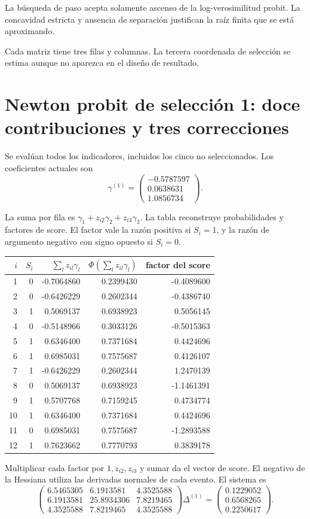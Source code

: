 \documentclass[11pt,a4paper]{article}
\begin{document}
La búsqueda de paso
acepta solamente ascenso
de la log-verosimilitud probit.
La concavidad estricta y
ausencia de separación
justifican la raíz finita
que se está aproximando.

Cada matriz tiene tres
filas y columnas.
La tercera coordenada
de selección se estima
aunque no aparezca
en el diseño de resultado.

\clearpage
\section{Newton probit de selección 1: doce contribuciones y tres correcciones}\label{unidad156}
Se evalúan todos los indicadores,
incluidos los cinco no seleccionados.
Los coeficientes actuales son
\[
\gamma^{(1)}=\begin{pmatrix}-0.5787597\\0.0638631\\1.0856734\end{pmatrix}.
\]

La suma por fila es
\(\gamma_1+z_{i2}\gamma_2+z_{i3}\gamma_3\).
La tabla reconstruye probabilidades
y factores de score.
El factor vale la razón
positiva si \(S_i=1\),
y la razón de argumento
negativo con signo opuesto
si \(S_i=0\).
\begin{center}\small\begin{tabular}{rrrrr}\toprule
\(i\)&\(S_i\)&\(\sum_lz_{il}\gamma_l\)&\(\Phi(\sum_lz_{il}\gamma_l)\)&factor del score\\\midrule
1&0&-0.7064860&0.2399430&-0.4089600\\
2&0&-0.6426229&0.2602344&-0.4386740\\
3&1&0.5069137&0.6938923&0.5056145\\
4&0&-0.5148966&0.3033126&-0.5015363\\
5&1&0.6346400&0.7371684&0.4424696\\
6&1&0.6985031&0.7575687&0.4126107\\
7&1&-0.6426229&0.2602344&1.2470139\\
8&0&0.5069137&0.6938923&-1.1461391\\
9&1&0.5707768&0.7159245&0.4734774\\
10&1&0.6346400&0.7371684&0.4424696\\
11&0&0.6985031&0.7575687&-1.2893588\\
12&1&0.7623662&0.7770793&0.3839178\\\bottomrule\end{tabular}\end{center}
Multiplicar cada factor por
\(1,z_{i2},z_{i3}\)
y sumar da el vector
de score.
El negativo de la Hessiana
utiliza las derivadas
normales de cada evento.
El sistema es
\[
\begin{pmatrix}6.5465305&6.1913581&4.3525588\\6.1913581&25.8934306&7.8219465\\4.3525588&7.8219465&4.3525588\end{pmatrix}\Delta^{(1)}=\begin{pmatrix}0.1229052\\0.6568265\\0.2250617\end{pmatrix}.
\]
\end{document}
